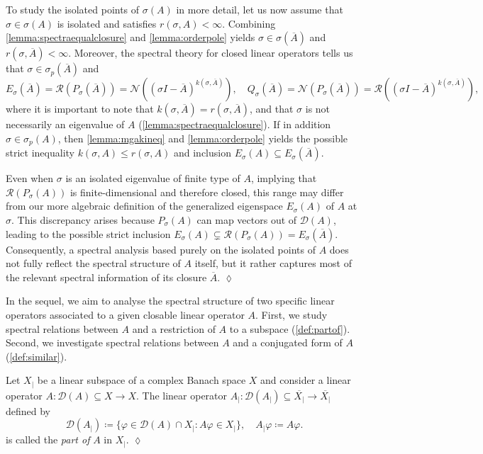 \documentclass[english]{myarticle}
\begin{document}
\begin{sloppypar}
To study the isolated points of $\sigma(A)$ in more detail, let us now assume that $\sigma \in \sigma(A)$ is isolated and satisfies $r(\sigma,A) < \infty$. Combining \cref{lemma:spectraequalclosure} and \cref{lemma:orderpole} yields $\sigma \in \sigma(\overline{A})$ and $r(\sigma, \overline{A}) < \infty$. Moreover, the spectral theory for closed linear operators tells us that $\sigma \in \sigma_p(\overline{A})$ and
\begin{equation*}
    E_\sigma(\overline{A}) = \mathcal{R}(P_\sigma(\overline{A}))= \mathcal{N}((\sigma I - \overline{A})^{k(\sigma,\overline{A})}), \quad Q_{\sigma}(\overline{A}) = \mathcal{N} (P_\sigma(\overline{A})) = \mathcal{R}((\sigma I - \overline{A})^{k(\sigma,\overline{A})}),
\end{equation*}
where it is important to note that $k(\sigma,\overline{A}) = r(\sigma,\overline{A})$, and that $\sigma$ is not necessarily an eigenvalue of $A$ (\cref{lemma:spectraequalclosure}). If in addition $\sigma \in \sigma_p(A)$, then \cref{lemma:mgakineq} and \cref{lemma:orderpole} yields the possible strict inequality $k(\sigma,A) \leq r(\sigma,A)$ and inclusion $E_\sigma(A) \subseteq E_\sigma(\overline{A})$.

\begin{remark} \label{remark:isolatedpoints}
Even when $\sigma$ is an isolated eigenvalue of finite type of $A$, implying that $\mathcal{R}(P_\sigma(A))$ is finite-dimensional and therefore closed, this range may differ from our more algebraic definition of the generalized eigenspace $E_\sigma(A)$ of $A$ at $\sigma$. This discrepancy arises because $P_\sigma(A)$ can map vectors out of $\mathcal{D}(A)$, leading to the possible strict inclusion $E_\sigma(A) \subsetneq \mathcal{R}(P_\sigma(A)) = E_\sigma(\overline{A})$. Consequently, a spectral analysis based purely on the isolated points of $A$ does not fully reflect the spectral structure of $A$ itself, but it rather captures most of the relevant spectral information of its closure $\overline{A}$. \hfill $\lozenge$
\end{remark}

In the sequel, we aim to analyse the spectral structure of two specific linear operators associated to a given closable linear operator $A$. First, we study spectral relations between $A$ and a restriction of $A$ to a subspace (\cref{def:partof}). Second, we investigate spectral relations between $A$ and a conjugated form of $A$ (\cref{def:similar}).

\begin{definition} \label{def:partof}
Let $X_{|}$ be a linear subspace of a complex Banach space $X$ and consider a linear operator $A : \mathcal{D}(A) \subseteq X \to X$. The linear operator $A_{|} : \mathcal{D}(A_{|}) \subseteq \overline{X_{|}} \to \overline{X_{|}}$ defined by
\begin{equation*}
    \mathcal{D}(A_{|}) \coloneqq \{ \varphi \in \mathcal{D}(A) \cap X_{|}  : A\varphi \in X_{|} \}, \quad A_{|}\varphi \coloneqq A\varphi.
\end{equation*}
is called the \emph{part of} $A$ in $X_{|}$. \hfill $\lozenge$
\end{definition}


\end{sloppypar}
\end{document}
